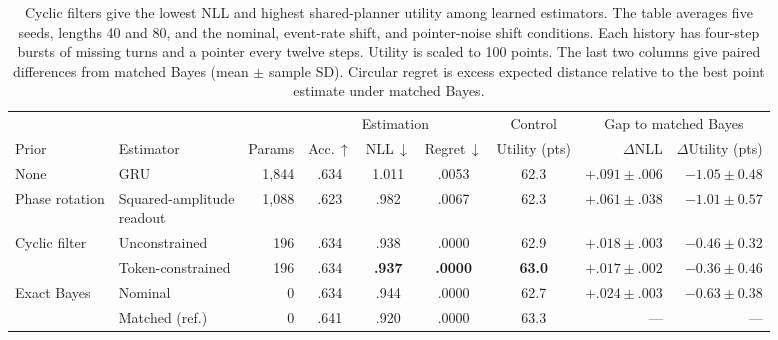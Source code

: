 \begin{table}[!htbp]
\centering\small
\caption{Cyclic filters give the lowest NLL and highest shared-planner utility
among learned estimators. The table averages five seeds, lengths 40 and 80, and the nominal,
event-rate shift, and pointer-noise shift conditions. Each history has four-step
bursts of missing turns and a pointer every twelve steps. Utility is scaled to
100 points. The last two columns give paired differences from matched Bayes
(mean $\pm$ sample SD). Circular regret is excess expected distance relative
to the best point estimate under matched Bayes.}
\label{tab:feedback}
\setlength{\tabcolsep}{2.7pt}
\begin{tabular}{llrccccrr}
\toprule
& & & \multicolumn{3}{c}{Estimation} & Control
& \multicolumn{2}{c}{Gap to matched Bayes} \\
\cmidrule(lr){4-6}\cmidrule(lr){7-7}\cmidrule(lr){8-9}
Prior & Estimator & Params & Acc.\,$\uparrow$ & NLL\,$\downarrow$
& Regret\,$\downarrow$ & Utility (pts) & $\Delta$NLL & $\Delta$Utility (pts) \\
\midrule
None & GRU & 1,844 & .634 & 1.011 & .0053 & 62.3
& $+.091\pm.006$ & $-1.05\pm0.48$ \\
Phase rotation & \shortstack[l]{Squared-amplitude\\readout} & 1,088 & .623 & .982 & .0067 & 62.3
& $+.061\pm.038$ & $-1.01\pm0.57$ \\
\midrule
\multirow{2}{*}{Cyclic filter} & Unconstrained & 196 & .634 & .938 & .0000 & 62.9
& $+.018\pm.003$ & $-0.46\pm0.32$ \\
& Token-constrained & 196 & .634 & \textbf{.937} & \textbf{.0000} & \textbf{63.0}
& $\mathbf{+.017\pm.002}$ & $\mathbf{-0.36\pm0.46}$ \\
\midrule
\multirow{2}{*}{Exact Bayes} & Nominal & 0 & .634 & .944 & .0000 & 62.7
& $+.024\pm.003$ & $-0.63\pm0.38$ \\
& Matched (ref.) & 0 & .641 & .920 & .0000 & 63.3 & --- & --- \\
\bottomrule
\end{tabular}
\end{table}
